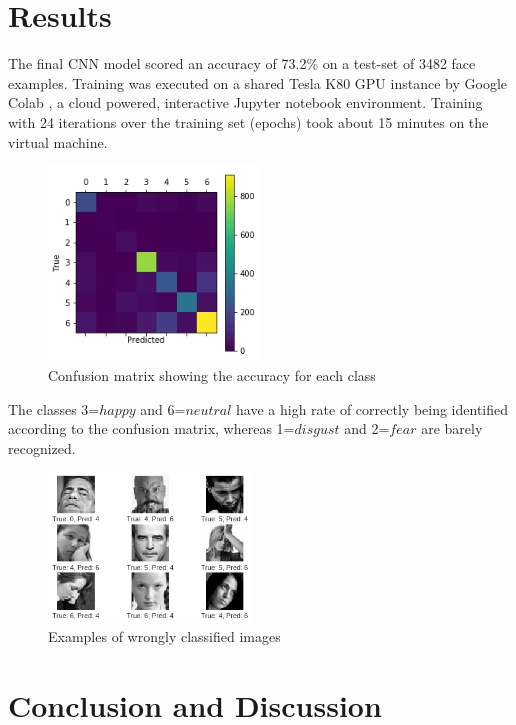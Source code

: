 \documentclass[twoside]{article}
\begin{document}
\begin{multicols}{2}


\section{Results}
The final CNN model scored an accuracy of 73.2\% on a test-set of 3482 face examples. Training was executed on a shared Tesla K80 GPU instance by Google Colab \cite{colab}, a cloud powered, interactive Jupyter notebook environment. Training with 24 iterations over the training set (epochs) took about 15 minutes on the virtual machine.

\begin{figure}[H]
	\includegraphics[width=0.5\textwidth]{confusion}
	\caption{Confusion matrix showing the accuracy for each class}
	\label{fig::confusion}
\end{figure}

The classes 3=$happy$ and 6=$neutral$ have a high rate of correctly being identified according to the confusion matrix, whereas 1=$disgust$ and 2=$fear$ are barely recognized.

\begin{figure}[H]
	\includegraphics[width=0.48\textwidth]{errors}
	\caption{Examples of wrongly classified images}
\end{figure}



\section{Conclusion and Discussion}


\end{multicols}
\end{document}
